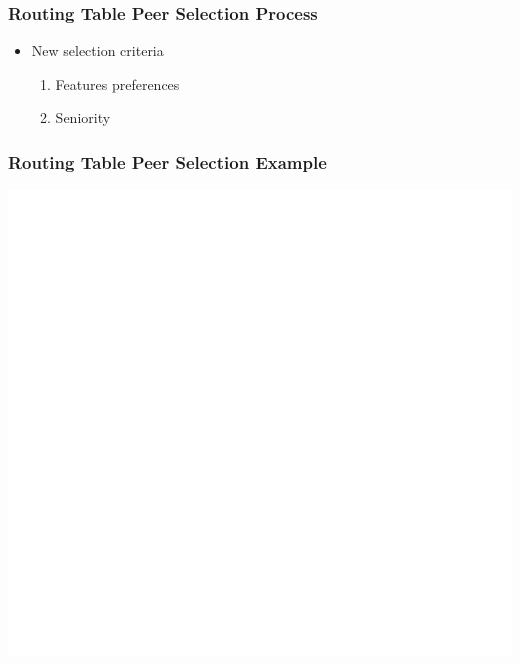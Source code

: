 \documentclass{../pl-slide}
\begin{document}
\begin{frame}
\frametitle{Routing Table Peer Selection Process}
\begin{itemize}
	\itemc Currently based on seniority only
	\bigskip
	\item[\greencube] New selection criteria
	\begin{enumerate}
		\item Features preferences
		\item Seniority
	\end{enumerate}
\end{itemize}
\end{frame}

\begin{frame}
\frametitle{Routing Table Peer Selection Example}
\begin{center}
	\includegraphics[scale=.23]{resources/trie-vanilla.png}
\end{center}
\end{frame}
\end{document}
